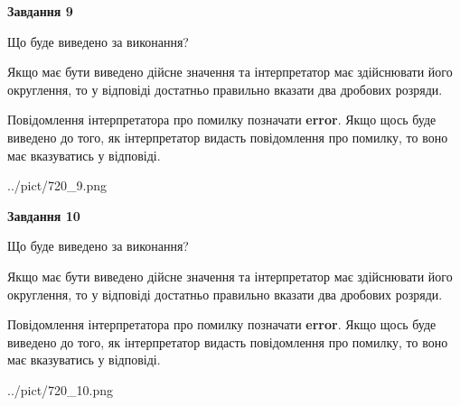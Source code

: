 \documentclass[12pt, ukrainian]{article}
\begin{document}
{\begin {Large}
{\begin {center}\textbf{Завдання 9}\end {center}}\par
Що буде виведено за виконання? \par

Якщо має бути виведено дійсне значення та інтерпретатор має здійснювати його округлення, 
то у відповіді достатньо правильно вказати два дробових розряди.

Повідомлення інтерпретатора про помилку позначати \textbf{error}.
Якщо щось буде виведено до того, як інтерпретатор видасть повідомлення про помилку, 
то воно має вказуватись у відповіді. \par

\begin{center}
	{../pict/720_9.png}
\end{center}
\newpage

{\begin {center}\textbf{Завдання 10}\end {center}}\par
Що буде виведено за виконання? \par

Якщо має бути виведено дійсне значення та інтерпретатор має здійснювати його округлення, 
то у відповіді достатньо правильно вказати два дробових розряди.

Повідомлення інтерпретатора про помилку позначати \textbf{error}.
Якщо щось буде виведено до того, як інтерпретатор видасть повідомлення про помилку, 
то воно має вказуватись у відповіді. \par

\begin{center}
	{../pict/720_10.png}
\end{center}
\newpage

\end {Large}}
\end{document}
